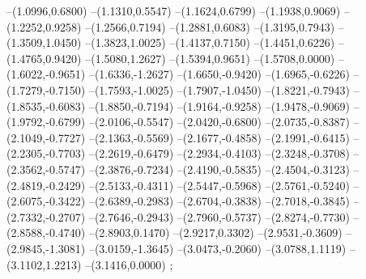 {--(1.0996,0.6800)
--(1.1310,0.5547)
--(1.1624,0.6799)
--(1.1938,0.9069)
--(1.2252,0.9258)
--(1.2566,0.7194)
--(1.2881,0.6083)
--(1.3195,0.7943)
--(1.3509,1.0450)
--(1.3823,1.0025)
--(1.4137,0.7150)
--(1.4451,0.6226)
--(1.4765,0.9420)
--(1.5080,1.2627)
--(1.5394,0.9651)
--(1.5708,0.0000)
--(1.6022,-0.9651)
--(1.6336,-1.2627)
--(1.6650,-0.9420)
--(1.6965,-0.6226)
--(1.7279,-0.7150)
--(1.7593,-1.0025)
--(1.7907,-1.0450)
--(1.8221,-0.7943)
--(1.8535,-0.6083)
--(1.8850,-0.7194)
--(1.9164,-0.9258)
--(1.9478,-0.9069)
--(1.9792,-0.6799)
--(2.0106,-0.5547)
--(2.0420,-0.6800)
--(2.0735,-0.8387)
--(2.1049,-0.7727)
--(2.1363,-0.5569)
--(2.1677,-0.4858)
--(2.1991,-0.6415)
--(2.2305,-0.7703)
--(2.2619,-0.6479)
--(2.2934,-0.4103)
--(2.3248,-0.3708)
--(2.3562,-0.5747)
--(2.3876,-0.7234)
--(2.4190,-0.5835)
--(2.4504,-0.3123)
--(2.4819,-0.2429)
--(2.5133,-0.4311)
--(2.5447,-0.5968)
--(2.5761,-0.5240)
--(2.6075,-0.3422)
--(2.6389,-0.2983)
--(2.6704,-0.3838)
--(2.7018,-0.3845)
--(2.7332,-0.2707)
--(2.7646,-0.2943)
--(2.7960,-0.5737)
--(2.8274,-0.7730)
--(2.8588,-0.4740)
--(2.8903,0.1470)
--(2.9217,0.3302)
--(2.9531,-0.3609)
--(2.9845,-1.3081)
--(3.0159,-1.3645)
--(3.0473,-0.2060)
--(3.0788,1.1119)
--(3.1102,1.2213)
--(3.1416,0.0000)
;}
